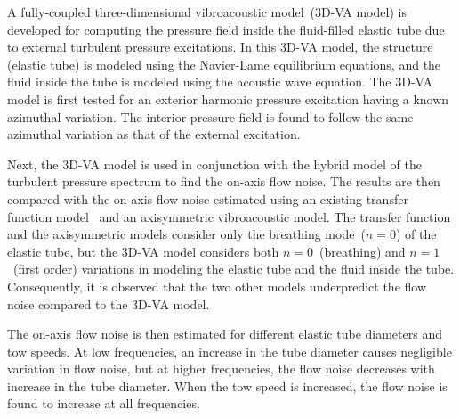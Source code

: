 \documentclass[11pt,cleanfoot]{asme2ej}
\begin{document}
A fully-coupled three-dimensional vibroacoustic model~(3D-VA model) is developed for computing the pressure field inside the fluid-filled elastic tube due to external turbulent pressure excitations. In this 3D-VA model, the structure (elastic tube) is modeled using the Navier-Lame equilibrium equations, and the fluid inside the tube is modeled using the acoustic wave equation. The 3D-VA model is first tested for an exterior harmonic pressure excitation having a known azimuthal variation. The interior pressure field is found to follow the same azimuthal variation as that of the external excitation.

Next, the 3D-VA model is used in conjunction with the hybrid model of the turbulent pressure spectrum to find the on-axis flow noise. The results are then compared with the on-axis flow noise estimated using an existing transfer function model~\cite{knight1996} and an axisymmetric vibroacoustic model. The transfer function and the axisymmetric models consider only the breathing mode~($n=0$) of the elastic tube, but the 3D-VA model considers both $n=0$~(breathing) and $n=1$~(first order) variations in modeling the elastic tube and the fluid inside the tube. Consequently, it is observed that the two other models underpredict the flow noise compared to the 3D-VA model.

The on-axis flow noise is then estimated for different elastic tube diameters and tow speeds. At low frequencies, an increase in the tube diameter causes negligible variation in flow noise, but at higher frequencies, the flow noise decreases with increase in the tube diameter. When the tow speed is increased, the flow noise is found to increase at all frequencies.

\end{document}
